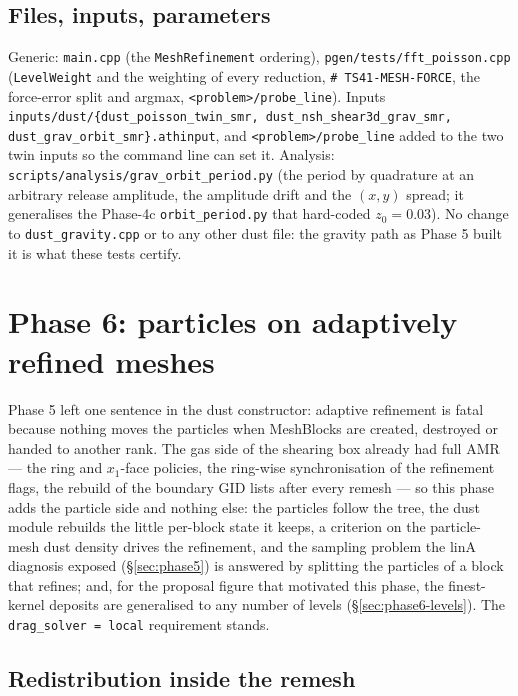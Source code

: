 \documentclass[11pt]{article}
\newcommand{\code}[1]{\texttt{#1}}
\newcommand{\file}[1]{\texttt{\small #1}}
\newcommand{\fn}[1]{\texttt{\small #1}}
\begin{document}
\subsection{Files, inputs, parameters}

Generic: \file{main.cpp} (the \code{MeshRefinement} ordering), \file{pgen/tests/fft\_poisson.cpp}
(\fn{LevelWeight} and the weighting of every reduction, \code{\# TS41-MESH-FORCE}, the
force-error split and argmax, \code{<problem>/probe\_line}). Inputs
\file{inputs/dust/\{dust\_poisson\_twin\_smr, dust\_nsh\_shear3d\_grav\_smr,
dust\_grav\_orbit\_smr\}.athinput}, and \code{<problem>/probe\_line} added to the two twin
inputs so the command line can set it. Analysis:
\file{scripts/analysis/grav\_orbit\_period.py} (the period by quadrature at an arbitrary
release amplitude, the amplitude drift and the $(x,y)$ spread; it generalises the
Phase-4c \file{orbit\_period.py} that hard-coded $z_0 = 0.03$). No change to
\file{dust\_gravity.cpp} or to any other dust file: the gravity path as Phase 5 built it
is what these tests certify.

\section{Phase 6: particles on adaptively refined meshes}
\label{sec:phase6}

Phase 5 left one sentence in the dust constructor: adaptive refinement is fatal because
nothing moves the particles when MeshBlocks are created, destroyed or handed to another
rank. The gas side of the shearing box already had full AMR --- the ring and $x_1$-face
policies, the ring-wise synchronisation of the refinement flags, the rebuild of the
boundary GID lists after every remesh --- so this phase adds the particle side and
nothing else: the particles follow the tree, the dust module rebuilds the little
per-block state it keeps, a criterion on the particle-mesh dust density drives the
refinement, and the sampling problem the linA diagnosis exposed (\S\ref{sec:phase5}) is
answered by splitting the particles of a block that refines; and, for the
proposal figure that motivated this phase, the finest-kernel deposits are generalised to
any number of levels (\S\ref{sec:phase6-levels}). The \code{drag\_solver = local}
requirement stands.

\subsection{Redistribution inside the remesh}
\end{document}
